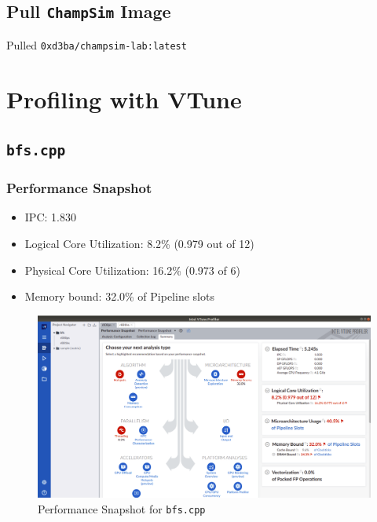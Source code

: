 \documentclass[11pt, swedish, openany]{book}
\begin{document}
\section*{Pull \texttt{ChampSim} Image}
Pulled \texttt{0xd3ba/champsim-lab:latest}

\chapter{Profiling with VTune}
\section{\texttt{bfs.cpp}}

\subsection*{Performance Snapshot}
\begin{itemize}
    \item IPC: 1.830
    \item Logical Core Utilization: 8.2\% (0.979 out of 12)
    \item Physical Core Utilization: 16.2\% (0.973 of 6)
    \item Memory bound: 32.0\% of Pipeline slots
\end{itemize}

\begin{figure}[H]
    \centering
    \includegraphics[scale=0.25]{vtune/bfs/ps.png}
    \caption{Performance Snapshot for \texttt{bfs.cpp}}
\end{figure}

\newpage
\end{document}
